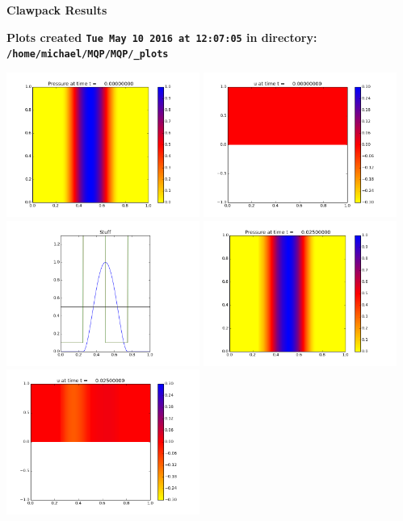 \documentclass[11pt]{article}
\begin{document}
        \begin{center}{\Large\bf Clawpack Results}\vskip 5pt
        
        \bf Plots created {\tt Tue May 10 2016 at 12:07:05} in directory: \vskip 5pt
        \verb+/home/michael/MQP/MQP/_plots+
        \end{center}
        \vskip 5pt
        \includegraphics[width=0.475\textwidth]{frame0000fig0.png}
\includegraphics[width=0.475\textwidth]{frame0000fig1.png}
\vskip 10pt 
\includegraphics[width=0.475\textwidth]{frame0000fig3.png}
\vskip 10pt 
\includegraphics[width=0.475\textwidth]{frame0001fig0.png}
\includegraphics[width=0.475\textwidth]{frame0001fig1.png}
\end{document}

